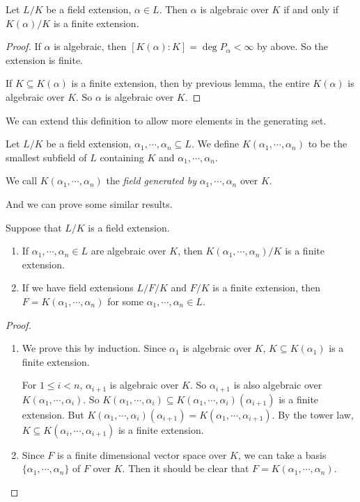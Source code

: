 \documentclass[a4paper]{article}
\begin{document}
\begin{cor}
  Let $L/K$ be a field extension, $\alpha \in L$. Then $\alpha$ is algebraic over $K$ if and only if $K(\alpha)/K$ is a finite extension.
\end{cor}

\begin{proof}
  If $\alpha$ is algebraic, then $[K(\alpha): K] = \deg P_\alpha < \infty$ by above. So the extension is finite.

  If $K\subseteq K(\alpha)$ is a finite extension, then by previous lemma, the entire $K(\alpha)$ is algebraic over $K$. So $\alpha$ is algebraic over $K$.
\end{proof}

We can extend this definition to allow more elements in the generating set.
\begin{defi}
  Let $L/K$ be a field extension, $\alpha_1, \cdots, \alpha_n\subseteq L$. We define $K(\alpha_1, \cdots, \alpha_n)$ to be the smallest subfield of $L$ containing $K$ and $\alpha_1, \cdots, \alpha_n$.

  We call $K(\alpha_1, \cdots, \alpha_n)$ the \emph{field generated by} $\alpha_1, \cdots, \alpha_n$ over $K$.
\end{defi}

And we can prove some similar results.

\begin{thm}
  Suppose that $L/K$ is a field extension.
  \begin{enumerate}
    \item If $\alpha_1, \cdots, \alpha_n \in L$ are algebraic over $K$, then $K(\alpha_1, \cdots, \alpha_n)/K$ is a finite extension.
    \item If we have field extensions $L/F/K$ and $F/K$ is a finite extension, then $F = K(\alpha_1, \cdots, \alpha_n)$ for some $\alpha_1,\cdots, \alpha_n \in L$.
  \end{enumerate}
\end{thm}

\begin{proof}\leavevmode
  \begin{enumerate}
    \item We prove this by induction. Since $\alpha_1$ is algebraic over $K$, $K\subseteq K(\alpha_1)$ is a finite extension.

      For $1 \leq i < n$, $\alpha_{i + 1}$ is algebraic over $K$. So $\alpha_{i + 1}$ is also algebraic over $K(\alpha_1, \cdots, \alpha_i)$. So $K(\alpha_1, \cdots, \alpha_i)\subseteq K(\alpha_1, \cdots, \alpha_i)(\alpha_{i + 1})$ is a finite extension. But $K(\alpha_1, \cdots, \alpha_i)(\alpha_{i + 1}) = K(\alpha_1, \cdots, \alpha_{i + 1})$. By the tower law, $K \subseteq K(\alpha_i, \cdots, \alpha_{i + 1})$ is a finite extension.

    \item Since $F$ is a finite dimensional vector space over $K$, we can take a basis $\{\alpha_1, \cdots, \alpha_n\}$ of $F$ over $K$. Then it should be clear that $F = K(\alpha_1, \cdots, \alpha_n)$.
  \end{enumerate}
\end{proof}
\end{document}
